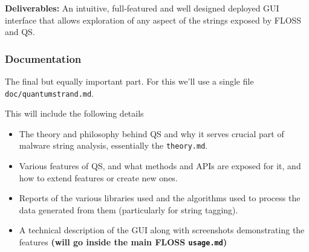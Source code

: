 \documentclass[12pt]{article}
\begin{document}
\begin{center}
\begin{minipage}{\textwidth}
\end{minipage}
\end{center}

\textbf{Deliverables:} An intuitive, full-featured and well designed deployed GUI interface that allows exploration of any aspect of the strings exposed by FLOSS and QS.

\newpage
\subsubsection*{Documentation}
{}

The final but equally important part. For this we'll use a single file \texttt{doc/quantumstrand.md}.

This will include the following details

\begin{itemize}
    \item The theory and philosophy behind QS and why it serves crucial part of malware string analysis, essentially the \texttt{theory.md}.
    \item Various features of QS, and what methods and APIs are exposed for it, and how to extend features or create new ones.
    \item Reports of the various libraries used and the algorithms used to process the data generated from them (particularly for string tagging).
    \item A technical description of the GUI along with screenshots demonstrating the features \textbf{(will go inside the main FLOSS \texttt{usage.md})}
\end{itemize}
\end{document}
